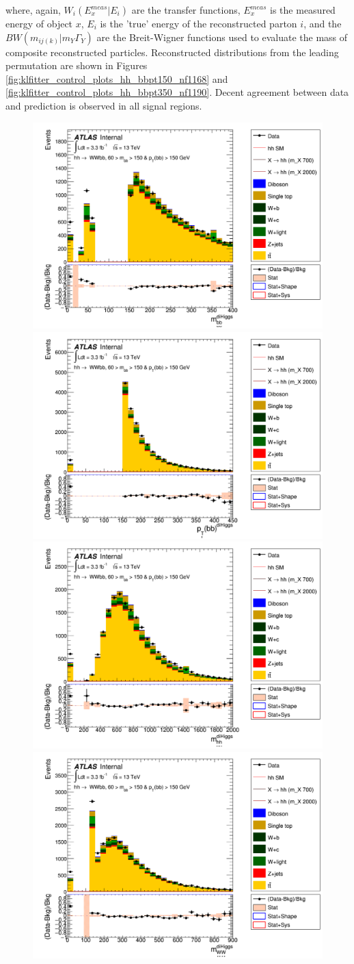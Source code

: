 where, again, $W_{i}(E_{x}^{meas}|E_{i})$ are the transfer functions, $E_{x}^{meas}$ is the measured energy of object $x$, $E_{i}$ is the 'true' energy of the reconstructed parton $i$, and the $BW(m_{ij(k)}| m_{Y}\Gamma_{Y})$ are the Breit-Wigner functions used to evaluate the mass of composite reconstructed particles. Reconstructed distributions from the leading permutation are shown in Figures \ref{fig:klfitter_control_plots_hh_bbpt150_nf1168} and \ref{fig:klfitter_control_plots_hh_bbpt350_nf1190}. Decent agreement between data and prediction is observed in all signal regions.


\begin{figure}[!hb]
\begin{center}
		\includegraphics[width=.47\textwidth]{figures/kinFit_appendix/bbpt150_NF1168/C_mBBcr_opt700_bbpt150_KLF_dihiggs_bb_m}
		\includegraphics[width=.47\textwidth]{figures/kinFit_appendix/bbpt150_NF1168/C_mBBcr_opt700_bbpt150_KLF_dihiggs_bb_pt}\\
		\includegraphics[width=.47\textwidth]{figures/kinFit_appendix/bbpt150_NF1168/C_mBBcr_opt700_bbpt150_KLF_dihiggs_hh_m}
		\includegraphics[width=.47\textwidth]{figures/kinFit_appendix/bbpt150_NF1168/C_mBBcr_opt700_bbpt150_KLF_dihiggs_ww_m}\\

\end{center}
\end{figure}
